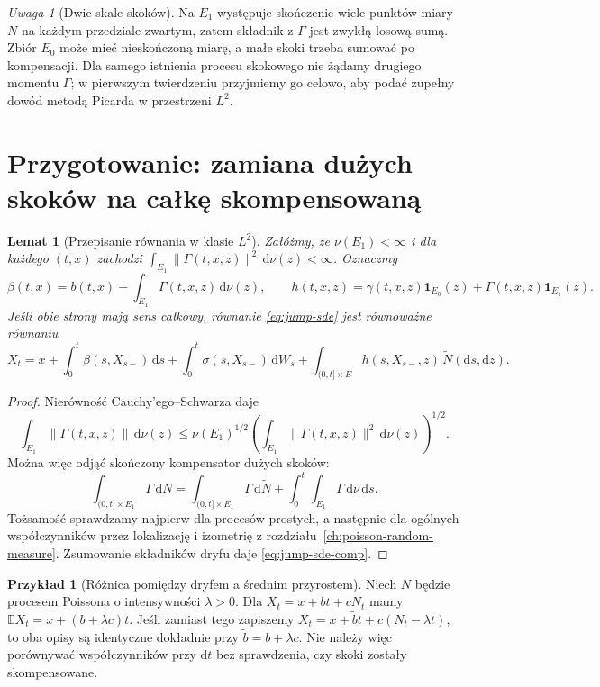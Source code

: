 \documentclass[11pt,a4paper,oneside]{report}
\numberwithin{equation}{chapter}
\theoremstyle{plain}
\newtheorem{lemat}[twierdzenie]{Lemat}
\theoremstyle{definition}
\newtheorem{przyklad}{Przykład}[chapter]
\theoremstyle{remark}
\newtheorem{uwaga}{Uwaga}[chapter]
\newcommand{\E}{\mathbb{E}}
\newcommand{\ind}[1]{\mathbf{1}_{#1}}
\newcommand{\dd}{\mathrm{d}}
\begin{document}
\begin{uwaga}[Dwie skale skoków]
Na $E_1$ występuje skończenie wiele punktów miary $N$ na każdym
przedziale zwartym, zatem składnik z $\Gamma$ jest zwykłą losową
sumą. Zbiór $E_0$ może mieć nieskończoną miarę, a małe skoki
trzeba sumować po kompensacji. Dla samego istnienia procesu
skokowego nie żądamy drugiego momentu $\Gamma$; w pierwszym
twierdzeniu przyjmiemy go celowo, aby podać zupełny dowód
metodą Picarda w przestrzeni $L^2$.
\end{uwaga}

\section{Przygotowanie: zamiana dużych skoków na całkę skompensowaną}\label{sec:volIII:13:02}

\begin{lemat}[Przepisanie równania w klasie $L^2$]\label{lem:volIII:13:01}
\label{lem:rewrite-jump-sde}
Załóżmy, że $\nu(E_1)<\infty$ i dla każdego $(t,x)$ zachodzi
$\int_{E_1}\|\Gamma(t,x,z)\|^2\,\dd\nu(z)<\infty$.
Oznaczmy
\[
 \beta(t,x)=b(t,x)+\int_{E_1}\Gamma(t,x,z)\,\dd\nu(z),\qquad
 h(t,x,z)=\gamma(t,x,z)\ind{E_0}(z)+\Gamma(t,x,z)\ind{E_1}(z).
\]
Jeśli obie strony mają sens całkowy, równanie
\eqref{eq:jump-sde} jest równoważne równaniu
\[
 X_t=x+\int_0^t\beta(s,X_{s-})\,\dd s
 +\int_0^t\sigma(s,X_{s-})\,\dd W_s
 +\int_{(0,t]\times E}h(s,X_{s-},z)\,\widetilde N(\dd s,\dd z).
 \tag{13.2}\label{eq:jump-sde-comp}
\]
\end{lemat}
\begin{proof}
Nierówność Cauchy'ego--Schwarza daje
\[
\int_{E_1}\|\Gamma(t,x,z)\|\,\dd\nu(z)
\le \nu(E_1)^{1/2}
\left(\int_{E_1}\|\Gamma(t,x,z)\|^2\,\dd\nu(z)\right)^{1/2}.
\]
Można więc odjąć skończony kompensator dużych skoków:
\[
\int_{(0,t]\times E_1}\Gamma\,\dd N
=\int_{(0,t]\times E_1}\Gamma\,\dd\widetilde N
 +\int_0^t\int_{E_1}\Gamma\,\dd\nu\,\dd s.
\]
Tożsamość sprawdzamy najpierw dla procesów prostych,
a następnie dla ogólnych współczynników przez lokalizację
i izometrię z rozdziału~\ref{ch:poisson-random-measure}.
Zsumowanie składników dryfu daje \eqref{eq:jump-sde-comp}.
\end{proof}

\begin{przyklad}[Różnica pomiędzy dryfem a średnim przyrostem]
Niech $N$ będzie procesem Poissona o intensywności
$\lambda>0$. Dla $X_t=x+bt+cN_t$ mamy
$\E X_t=x+(b+\lambda c)t$. Jeśli zamiast tego zapiszemy
$X_t=x+\widetilde b t+c(N_t-\lambda t)$, to oba opisy
są identyczne dokładnie przy $\widetilde b=b+\lambda c$.
Nie należy więc porównywać współczynników przy $\dd t$ bez
sprawdzenia, czy skoki zostały skompensowane.
\end{przyklad}
\end{document}

